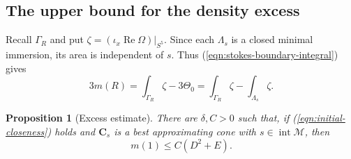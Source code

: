 \documentclass[11pt,a4paper]{article}
\numberwithin{equation}{section}
\newtheorem{proposition}[theorem]{Proposition}
\theoremstyle{definition}
\theoremstyle{remark}
\newcommand{\Ree}{\operatorname{Re}}
\begin{document}
	
	
	\subsection{The upper bound for the density excess}
	
	Recall $\Gamma_R$ and put
	$\zeta=(\iota_x\Ree\Omega)|_{S^5}$. Since each $\Lambda_s$ is a closed
	minimal immersion, its area is independent of $s$. Thus
	(\ref{eqn:stokes-boundary-integral}) gives
	\[
	3m(R)=\int_{\Gamma_R}\zeta-3\Theta_0
	=\int_{\Gamma_R}\zeta-\int_{\Lambda_s}\zeta.
	\]
	
	\begin{proposition}[Excess estimate]\label{prop:density}
		There are $\delta,C>0$ such that, if (\ref{eqn:initial-closeness}) holds
		and $\mathbf C_s$ is a best approximating cone with
		$s\in\operatorname{int}\mathcal M$, then
		\[
		m(1)\le C(D^2+E).
		\]
	\end{proposition}
	
\end{document}
